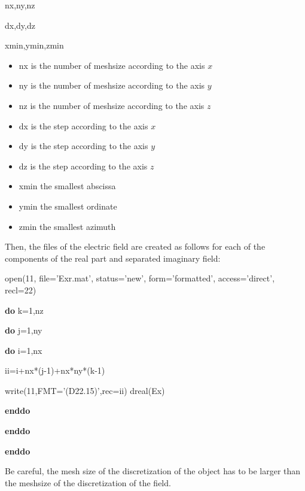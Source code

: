nx,ny,nz 

dx,dy,dz

xmin,ymin,zmin

\begin{itemize}
\item  nx is the number of meshsize according to the axis $x$
\item  ny is the number of meshsize according to the axis $y$
\item  nz is the number of meshsize according to the axis $z$
\item  dx is the step according to the axis $x$
\item  dy is the step according to the axis $y$
\item  dz is the step according to the axis $z$
\item xmin the smallest abscissa
\item ymin the smallest ordinate
\item zmin the smallest azimuth
\end{itemize}

Then, the files of the electric field are created as follows for 
each of the components of the real part and separated imaginary field:

\vspace{10mm}

open(11, file='Exr.mat', status='new', form='formatted', access='direct', recl=22)

{\bf do} k=1,nz

\hspace{5mm} {\bf do} j=1,ny

\hspace{10mm} {\bf do} i=1,nx 

\hspace{15mm} ii=i+nx*(j-1)+nx*ny*(k-1)

\hspace{15mm} write(11,FMT='(D22.15)',rec=ii) dreal(Ex)

\hspace{10mm} {\bf enddo}

\hspace{5mm} {\bf enddo}

{\bf enddo}

\vspace{10mm}

Be careful, the mesh size of the discretization of the object has to
be larger than the meshsize of the discretization of the field.
